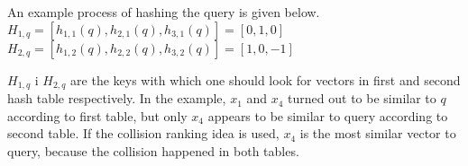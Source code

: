 An example process of hashing the query is given below.\\
$H_{1,q} = [h_{1,1}(q), h_{2,1}(q), h_{3,1}(q)] = [0, 1, 0]$\\
$H_{2,q} = [h_{1,2}(q), h_{2,2}(q), h_{3,2}(q)] = [1, 0, -1]$

$H_{1,q}$ i $H_{2,q}$ are the keys with which one should look for vectors in first and second hash table respectively.
In the example, $x_1$ and $x_4$ turned out to be similar to $q$ according to first table, but only $x_4$ appears to be similar to query according to second table.
If the collision ranking idea is used, $x_4$ is the most similar vector to query, because the collision happened in both tables.
